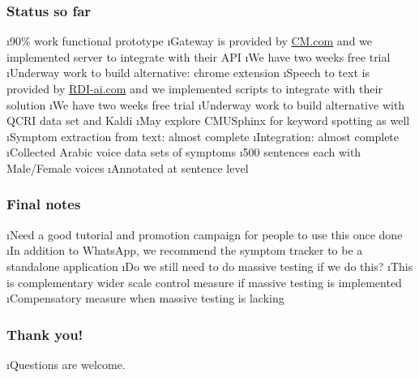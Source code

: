 \documentclass[t,xcolor=pdftex,dvipsnames,table]{beamer}
\begin{document}
\begin{wideframe}
  \frametitle{Status so far} 
  \be 
  \i 90\% work functional prototype
  \i Gateway is provided by \url{CM.com} and we implemented server to integrate with their API
    \be 
    \i We have two weeks free trial 
    \i Underway work to build alternative: chrome extension
    \ee
  \i Speech to text is provided by \url{RDI-ai.com} and we implemented scripts to integrate with their solution
    \be \i We have two weeks free trial 
        \i Underway work to build alternative with QCRI data set and Kaldi 
        \i May explore CMUSphinx for keyword spotting as well 
    \ee
  \i Symptom extraction from text: almost complete
  \i Integration: almost complete 
  \i Collected Arabic voice data sets of symptoms 
    \be \i 500 sentences each with Male/Female voices 
        \i Annotated at sentence level 
    \ee
  \ee 
\end{wideframe} 


\begin{wideframe}
  \frametitle{Final notes } 
  \be 
  \i Need a good tutorial and promotion campaign for people to use this once done
  \i In addition to WhatsApp, we recommend the symptom tracker to be a standalone application
  \i Do we still need to do massive testing if we do this?
  \be \i This is complementary wider scale control measure if massive testing is implemented
      \i Compensatory measure when massive testing is lacking
      \ee 
  \ee 
\end{wideframe} 


\begin{wideframe}
  \frametitle{Thank you! } 
  \be 
  \i Questions are welcome. 
  \ee 
\end{wideframe} 
\end{document}
